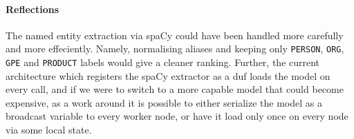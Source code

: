 \paragraph{Reflections}

The named entity extraction via spaCy could have been handled more
carefully and more effeciently. Namely, normalising
aliases and keeping only \texttt{PERSON}, \texttt{ORG}, \texttt{GPE} and
\texttt{PRODUCT} labels would give a cleaner ranking. Further, the
current architecture which registers the spaCy extractor as a duf
loads the model on every call, and if we were to switch to a more
capable model that could become expensive, as a work around it is
possible to either serialize the model as a broadcast variable to
every worker node, or have it load only once on every node via some
local state.
